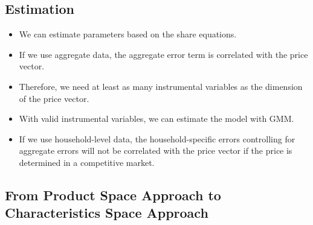 \documentclass[]{book}
\providecommand{\tightlist}{%
  \setlength{\itemsep}{0pt}\setlength{\parskip}{0pt}}
\begin{document}
\subsection{Estimation}\label{estimation}

\begin{itemize}
\tightlist
\item
  We can estimate parameters based on the share equations.
\item
  If we use aggregate data, the aggregate error term is correlated with
  the price vector.
\item
  Therefore, we need at least as many instrumental variables as the
  dimension of the price vector.
\item
  With valid instrumental variables, we can estimate the model with GMM.
\item
  If we use household-level data, the household-specific errors
  controlling for aggregate errors will not be correlated with the price
  vector if the price is determined in a competitive market.
\end{itemize}

\subsection{From Product Space Approach to Characteristics Space
Approach}\label{from-product-space-approach-to-characteristics-space-approach}
\end{document}
